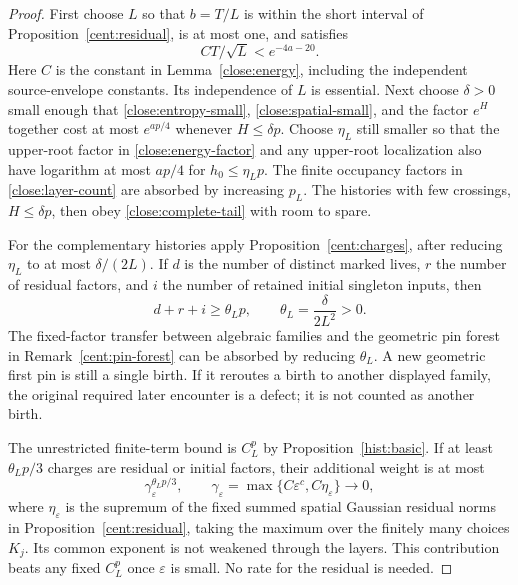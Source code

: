 \begin{proof}
First choose $L$ so that $b=T/L$ is within the short interval of
Proposition~\ref{cent:residual}, is at most one, and satisfies
\[
 C T/\sqrt L<e^{-4a-20}.
\]
Here $C$ is the constant in Lemma~\ref{close:energy}, including
the independent source-envelope constants. Its independence of
$L$ is essential. Next choose $\delta>0$ small enough that
\eqref{close:entropy-small}, \eqref{close:spatial-small}, and the
factor $e^H$ together cost at most $e^{ap/4}$ whenever
$H\leq\delta p$. Choose $\eta_L$ still smaller so that the
upper-root factor in \eqref{close:energy-factor} and any
upper-root localization also have logarithm at most $ap/4$ for
$h_0\leq\eta_Lp$. The finite occupancy factors in
\eqref{close:layer-count} are absorbed by increasing $p_L$.
The histories with few crossings, $H\leq\delta p$, then obey
\eqref{close:complete-tail} with room to spare.

For the complementary histories apply
Proposition~\ref{cent:charges}, after reducing $\eta_L$ to at
most $\delta/(2L)$. If $d$ is the number of distinct marked
lives, $r$ the number of residual factors, and $i$ the number of
retained initial singleton inputs, then
\[
 d+r+i\geq\theta_Lp,\qquad
 \theta_L=\frac{\delta}{2L^2}>0.
\]
The fixed-factor transfer between algebraic families and the
geometric pin forest in Remark~\ref{cent:pin-forest} can be
absorbed by reducing $\theta_L$. A new geometric first pin is
still a single birth. If it reroutes a birth to another displayed
family, the original required later encounter is a defect; it is
not counted as another birth.

The unrestricted finite-term bound is $C_L^p$ by
Proposition~\ref{hist:basic}. If at least $\theta_Lp/3$ charges
are residual or initial factors, their additional weight is at
most
\[
 \gamma_\varepsilon^{\theta_Lp/3},\qquad
 \gamma_\varepsilon=
 \max\{C\varepsilon^c,C\eta_\varepsilon\}
 \longrightarrow0,
\]
where $\eta_\varepsilon$ is the supremum of the fixed summed
spatial Gaussian residual norms in
Proposition~\ref{cent:residual}, taking the maximum over the
finitely many choices $K_j$. Its common exponent is not weakened
through the layers. This contribution beats any fixed
$C_L^p$ once $\varepsilon$ is small. No rate for the residual is
needed.


\end{proof}
